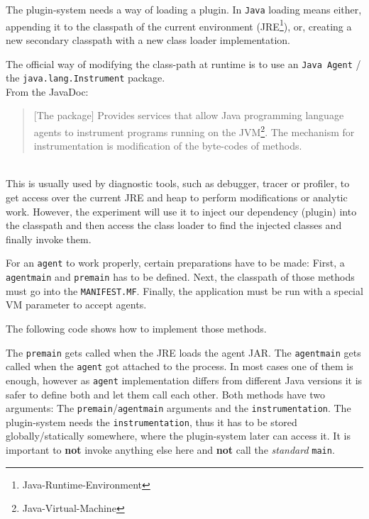 The plugin-system needs a way of loading a plugin.
In \texttt{Java} loading means either, appending it to the classpath of the current environment (JRE\footnote{Java-Runtime-Environment}), or, creating a new secondary classpath with a new class loader implementation.

The official way of modifying the class-path at runtime is to use an \texttt{Java Agent} / the \texttt{java.lang.Instrument} package. \\
From the JavaDoc:
\begin{quote}
    [The package] Provides services that allow Java programming language agents to instrument programs running on the JVM\footnote{Java-Virtual-Machine}.\newline
    The mechanism for instrumentation is modification of the byte-codes of methods.
\end{quote}\parencite{javadoc:instrument}\\\clearpage
This is usually used by diagnostic tools, such as debugger, tracer or profiler, to get access over the current JRE and heap to perform modifications or analytic work.
However, the experiment will use it to inject our dependency (plugin) into the classpath and then access the class loader to find the injected classes and finally invoke them.

For an \texttt{agent} to work properly, certain preparations have to be made:
First, a \lstinline{agentmain} and \lstinline{premain} has to be defined.
Next, the classpath of those methods must go into the \texttt{MANIFEST.MF}.
Finally, the application must be run with a special VM parameter to accept agents.

The following code shows how to implement those methods.

The \lstinline{premain} gets called when the JRE loads the agent JAR.
The \lstinline{agentmain} gets called when the \texttt{agent} got attached to the process.
In most cases one of them is enough, however as \texttt{agent} implementation differs from different Java versions it is safer to define both and let them call each other.
Both methods have two arguments: 
The \lstinline{premain}/\lstinline{agentmain} arguments and the \lstinline{instrumentation}.
The plugin-system needs the \lstinline{instrumentation}, thus it has to be stored globally/statically somewhere, where the plugin-system later can access it.
It is important to \textbf{not} invoke anything else here and \textbf{not} call the \textit{standard} \lstinline{main}.

